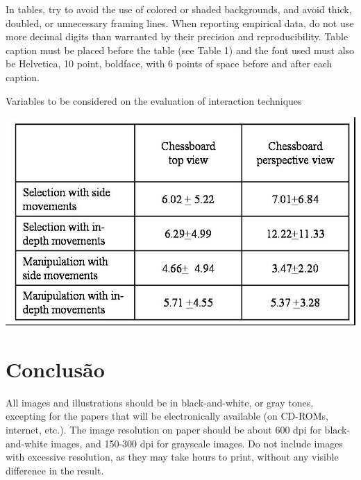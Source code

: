 \documentclass[12pt]{article}
\begin{document}
In tables, try to avoid the use of colored or shaded backgrounds, and avoid
thick, doubled, or unnecessary framing lines. When reporting empirical data,
do not use more decimal digits than warranted by their precision and
reproducibility. Table caption must be placed before the table (see Table 1)
and the font used must also be Helvetica, 10 point, boldface, with 6 points of
space before and after each caption.

\begin{table}[ht]
\centering
\caption{Variables to be considered on the evaluation of interaction
  techniques}
\label{tab:exTable1}
\includegraphics[width=.7\textwidth]{table.jpg}
\end{table}

\section{Conclusão}
\label{sec:conclusao}

All images and illustrations should be in black-and-white, or gray tones,
excepting for the papers that will be electronically available (on CD-ROMs,
internet, etc.). The image resolution on paper should be about 600 dpi for
black-and-white images, and 150-300 dpi for grayscale images.  Do not include
images with excessive resolution, as they may take hours to print, without any
visible difference in the result. 



\end{document}

